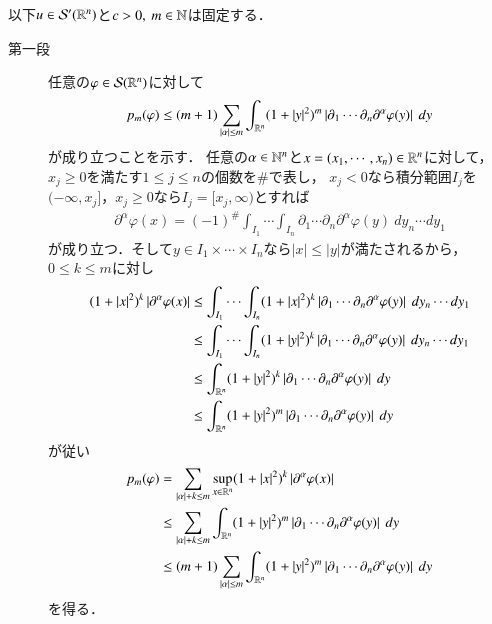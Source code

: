 	\begin{prf}以下$u \in \mathcal{S}'(\mathbb{R}^n)$と$c>0,\ m \in \mathbb{N}$は固定する．
		\begin{description}
			\item[第一段]
				任意の$\varphi \in \mathcal{S}(\mathbb{R}^n)$に対して
				\begin{align}
					p_m(\varphi)
					\leq (m+1) \sum_{|\alpha| \leq m} \int_{\mathbb{R}^n} (1+|y|^2)^m \left| \partial_1 \cdots \partial_n\partial^\alpha \varphi(y) \right|\ dy
					\label{eq:structure_theorem_of_tempered_distributions_1}
				\end{align}
				が成り立つことを示す．
				任意の$\alpha \in \mathbb{N}^n$と$x = (x_1,\cdots,x_n) \in \mathbb{R}^n$に対して，
				$x_j \geq 0$を満たす$1 \leq j \leq n$の個数を$\#$で表し，
				$x_j < 0$なら積分範囲$I_j$を$(-\infty,x_j]$，$x_j \geq 0$なら$I_j = [x_j,\infty)$とすれば
				\begin{align}
					\partial^\alpha \varphi(x)
					= (-1)^{\#} \int_{I_1}\cdots\int_{I_n} \partial_1 \cdots \partial_n\partial^\alpha \varphi(y)\ dy_n \cdots dy_1
				\end{align}
				が成り立つ．そして$y \in I_1 \times \cdots \times I_n$なら$|x| \leq |y|$が満たされるから，
				$0 \leq k \leq m$に対し
				\begin{align}
					(1+|x|^2)^k \left| \partial^\alpha \varphi(x) \right|
					&\leq \int_{I_1}\cdots\int_{I_n} (1+|x|^2)^k \left| \partial_1 \cdots \partial_n\partial^\alpha \varphi(y) \right|\ dy_n \cdots dy_1 \\
					&\leq \int_{I_1}\cdots\int_{I_n} (1+|y|^2)^k \left| \partial_1 \cdots \partial_n\partial^\alpha \varphi(y) \right|\ dy_n \cdots dy_1 \\
					&\leq \int_{\R^n} (1+|y|^2)^k \left| \partial_1 \cdots \partial_n\partial^\alpha \varphi(y) \right|\ dy \\
					&\leq \int_{\R^n} (1+|y|^2)^m \left| \partial_1 \cdots \partial_n\partial^\alpha \varphi(y) \right|\ dy
				\end{align}
				が従い
				\begin{align}
					p_m(\varphi) &= \sum_{|\alpha|+k \leq m} \operatorname*{sup}_{x \in \mathbb{R}^n} (1+|x|^2)^k \left| \partial^\alpha \varphi(x) \right| \\
					&\leq \sum_{|\alpha|+k \leq m} \int_{\mathbb{R}^n} (1+|y|^2)^m \left| \partial_1 \cdots \partial_n\partial^\alpha \varphi(y) \right|\ dy \\
					&\leq (m+1) \sum_{|\alpha| \leq m} \int_{\mathbb{R}^n} (1+|y|^2)^m \left| \partial_1 \cdots \partial_n\partial^\alpha \varphi(y) \right|\ dy
				\end{align}
				を得る．
				

\end{description}
\end{prf}
